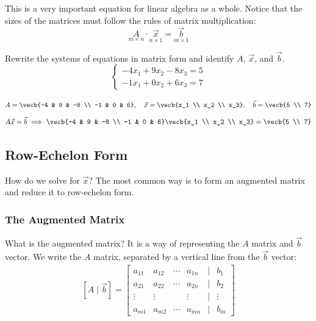 This is a very important equation for linear algebra as a whole. Notice that the sizes of the matrices must follow the rules of matrix multiplication:
\[\underset{m \times n}{A} \cdot \underset{n \times 1}{\vec{x}} = \underset{m\times 1}{\vec{b}}\]

\begin{Exercise}[title=Matrix Equation, label=matrixeq1]
       Rewrite the systems of equations in matrix form and identify $A$, $\vec{x}$, and $\vec{b}$. 
       \[\begin{cases}
       -4x_1 + 9x_2 - 8x_3= 5\\
       -1x_1 + 0x_2 + 6x_3= 7
       \end{cases}\]
\end{Exercise}

\begin{Answer}[ref=matrixeq1]
     \[A = \vecb{-4 & 9 & -8 \\ -1 & 0 & 6}, \quad \vec{x} = \vecb{x_1 \\ x_2 \\ x_3}, \quad \vec{b} = \vecb{5 \\ 7}\]
     \[A\vec{x}=\vec{b} \implies \vecb{-4 & 9 & -8 \\ -1 & 0 & 6}\vecb{x_1 \\ x_2 \\ x_3} = \vecb{5 \\ 7}\]
\end{Answer}

\subsection{Row-Echelon Form}
How do we solve for $\vec{x}$? The most common way is to form an augmented matrix and reduce it to row-echelon form. 
\subsubsection{The Augmented Matrix}
What is the augmented matrix? It is a way of representing the $A$ matrix and $\vec{b}$ vector. We write the $A$ matrix, separated by a vertical line from the $\vec{b}$ vector:
$$\begin{array}{c} [A \mid \vec{b}] =
\begin{bmatrix}
a_{11} & a_{12} & \cdots & a_{1n} & \vert & b_1 \\
a_{21} & a_{22} & \cdots & a_{2n} & \vert & b_2 \\
\vdots & \vdots &        & \vdots & \vert & \vdots \\
a_{m1} & a_{m2} & \cdots & a_{mn} & \vert & b_m
\end{bmatrix} \end{array}$$

